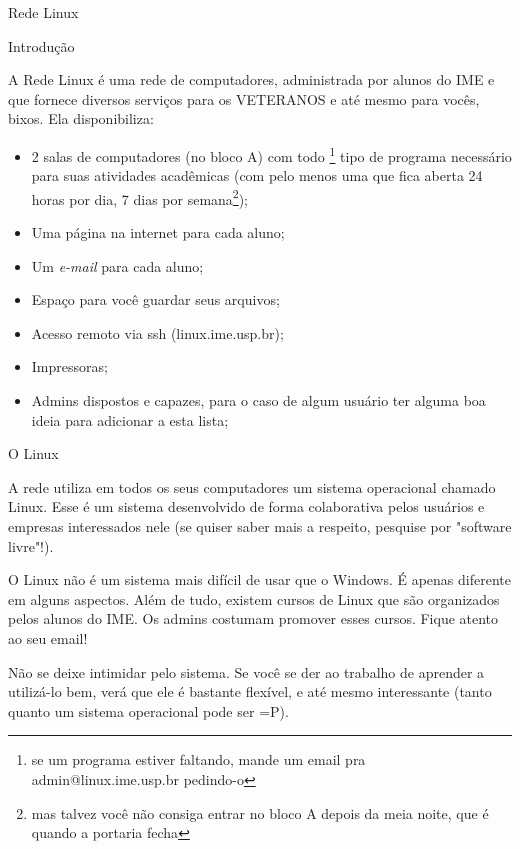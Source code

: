 \begin{subsecao}{Rede Linux}

\begin{subsubsecao}{Introdução}

A Rede Linux é uma rede de computadores, administrada por alunos do IME e
que fornece diversos serviços para os VETERANOS e até mesmo para vocês, bixos.
Ela disponibiliza:

\begin{itemize}
\item 2 salas de computadores (no bloco A) com todo \footnote{se um programa
estiver faltando, mande um email pra admin@linux.ime.usp.br pedindo-o} tipo de
programa necessário para suas atividades acadêmicas (com pelo menos uma que fica
aberta 24 horas por dia, 7 dias por semana\footnote{mas
talvez você não consiga entrar no bloco A depois da meia noite, que é quando a
portaria fecha});
\item Uma página na internet para cada aluno;
\item Um \textit{e-mail} para cada aluno;
\item Espaço para você guardar seus arquivos;
\item Acesso remoto via ssh (linux.ime.usp.br);
\item Impressoras;
\item Admins dispostos e capazes, para o caso de algum usuário ter alguma boa
ideia para adicionar a esta lista;
\end{itemize}
\end{subsubsecao}

\begin{subsubsecao}{O Linux}

A rede utiliza em todos os seus computadores um sistema operacional chamado
Linux. Esse é um sistema desenvolvido de forma colaborativa pelos usuários
e empresas interessados nele (se quiser saber mais a respeito, pesquise
por "software livre"!).

O Linux não é um sistema mais difícil de usar que o Windows. É apenas
diferente em alguns aspectos. Além de tudo, existem cursos de Linux que são
organizados pelos alunos do IME. Os admins costumam promover esses cursos.
Fique atento ao seu email!

Não se deixe intimidar pelo sistema. Se você se der ao trabalho de
aprender a utilizá-lo bem, verá que ele é bastante flexível, e até mesmo
interessante (tanto quanto um sistema operacional pode ser =P).

\end{subsubsecao}


\end{subsecao}
